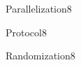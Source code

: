 \documentclass[a4paper]{article}
\begin{document}
\header

\begin{problem}{Parallelization}{8}
\end{problem}

\begin{problem}{Protocol}{8}
\begin{acode}
\end{acode}
\end{problem}


\begin{problem}{Randomization}{8}
\begin{acode}
\end{acode}
\end{problem}
\end{document}
